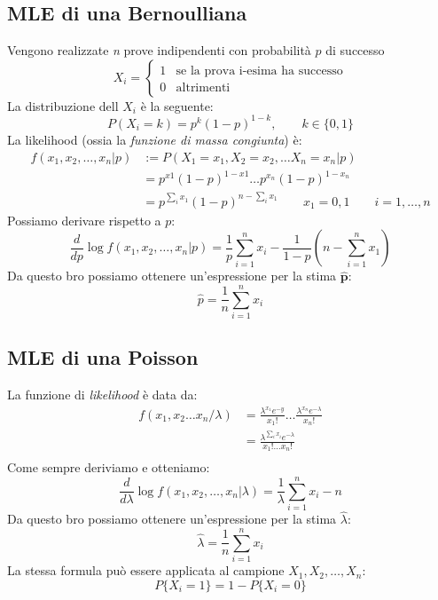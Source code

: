 \documentclass[]{article}
\begin{document}
    \subsection{MLE di una Bernoulliana}
    Vengono realizzate \textit{n} prove indipendenti con probabilità $p$ di successo
    \begin{equation*}
        X_i =
        \begin{cases}
            1 & \text{se la prova i-esima ha successo} \\
            0 & \text{altrimenti}
        \end{cases}
    \end{equation*}
    La distribuzione dell $X_i$ è la seguente:
    \[ P(X_i = k) = p^k (1-p)^{1-k}, \qquad k \in \{0,1\} \]
    La likelihood (ossia la \textit{funzione di massa congiunta}) è:
    \begin{equation*}
        \begin{split}
            f(x_1, x_2, \ldots, x_n \rvert p) &:= P(X_1 = x_1, X_2 = x_2, \ldots X_n = x_n \rvert p) \\
            &= p^{x1}(1-p)^{1-x1} \ldots p^{x_n}(1-p)^{1-x_n} \\
            &= p^{\sum_{i}^{} x_1}(1-p)^{n- \sum_{i}^{} x_1} \qquad x_1 = 0,1 \qquad i = 1, \ldots, n
        \end{split}
    \end{equation*}
    Possiamo derivare rispetto a $p$:
    \[ \frac{d}{dp} \log f(x_1, x_2, \ldots, x_n \rvert p) = \frac{1}{p} \sum_{i = 1}^{n} x_i - \frac{1}{1- p} \left(n-\sum_{i = 1}^{n} x_1 \right) \]
    Da questo bro possiamo ottenere un'espressione per la stima $\boldsymbol{\hat{p}}$:
    \[ \hat{p} = \frac{1}{n} \sum_{i = 1}^{n} x_i \]
    \subsection{MLE di una Poisson}
    La funzione di \textit{likelihood} è data da:
    \begin{equation*}
        \begin{split}
            f(x_1, x_2 \ldots x_n / \lambda) &= \frac{\lambda^{x_1} e^{-y}}{x_1!} \ldots \frac{\lambda^{x_n} e^{-\lambda}}{x_n!} \\
            &= \frac{\lambda^{\sum_{i}^{} x_i} e^{-\lambda}}{x_1 ! \ldots x_n !} \\
        \end{split}
    \end{equation*}
    Come sempre deriviamo e otteniamo:
    \[ \frac{d}{d\lambda} \log f(x_1, x_2, \ldots, x_n \rvert \lambda) = \frac{1}{\lambda} \sum_{i = 1}^{n} x_i - n \]
    Da questo bro possiamo ottenere un'espressione per la stima $\hat{\lambda}$:
    \[ \hat{\lambda} = \frac{1}{n} \sum_{i = 1}^{n} x_i \]
    La stessa formula può essere applicata al campione $X_1, X_2, \ldots, X_n$:
    \[ P\{X_i = 1\} = 1 - P\{X_i = 0\} \]
\end{document}

